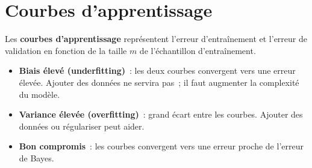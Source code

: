 \section{Courbes d'apprentissage}
\label{sec:learning-curves}

\begin{definition}
Les \textbf{courbes d'apprentissage} repr\'esentent l'erreur
d'entra\^inement et l'erreur de validation en fonction de la taille $m$
de l'\'echantillon d'entra\^inement.
\end{definition}

\begin{center}
\end{center}

\begin{bonnepratique}[title=\textbf{Diagnostic par les courbes d'apprentissage}]
\begin{itemize}
  \item \textbf{Biais \'elev\'e (underfitting)}~: les deux courbes convergent
    vers une erreur \'elev\'ee. Ajouter des donn\'ees ne servira pas~;
    il faut augmenter la complexit\'e du mod\`ele.
  \item \textbf{Variance \'elev\'ee (overfitting)}~: grand \'ecart entre les
    courbes. Ajouter des donn\'ees ou r\'egulariser peut aider.
  \item \textbf{Bon compromis}~: les courbes convergent vers une erreur
    proche de l'erreur de Bayes.
\end{itemize}
\end{bonnepratique}

